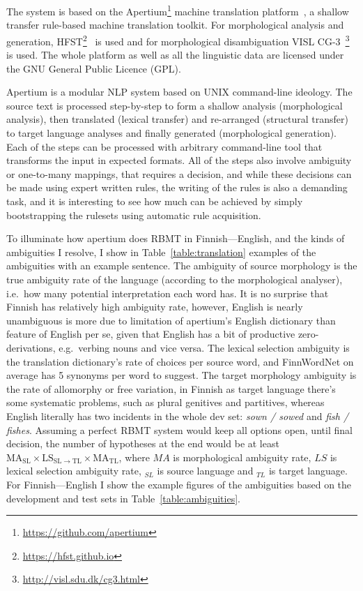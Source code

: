 \documentclass[11pt,a4paper]{article}
\begin{document}
The system is based on the Apertium\footnote{\url{https://github.com/apertium}}
machine translation platform~\cite{forcada2011apertium}, a shallow transfer
rule-based machine translation toolkit. For morphological analysis and
generation, HFST\footnote{\url{https://hfst.github.io}}~\cite{linden2011hfst} is
used and for morphological disambiguation VISL
CG-3~\footnote{\url{http://visl.sdu.dk/cg3.html}} is used.  The whole platform
as well as all the linguistic data are licensed under the GNU General Public
Licence (GPL).

Apertium is a modular NLP system based on UNIX command-line ideology. The source
text is processed step-by-step to form a shallow analysis (morphological
analysis), then translated (lexical transfer) and re-arranged (structural
transfer) to target language analyses and finally generated (morphological
generation). Each of the steps can be processed with arbitrary command-line tool
that transforms the input in expected formats. All of the steps also involve
ambiguity or one-to-many mappings, that requires a decision, and while these
decisions can be made using expert written rules, the writing of the rules is
also a demanding task, and it is interesting to see how much can be achieved by
simply bootstrapping the rulesets using automatic rule acquisition.

To illuminate how apertium does RBMT in Finnish---English, and the kinds of
ambiguities I resolve, I show in Table~\ref{table:translation} examples of the
ambiguities with an example sentence. The ambiguity of source morphology is the
true ambiguity rate of the language (according to the morphological analyser),
i.e.\ how many potential interpretation each word has. It is no surprise that
Finnish has relatively high ambiguity rate, however, English is nearly
unambiguous is more due to limitation of apertium's English dictionary than
feature of English per se, given that English has a bit of productive
zero-derivations, e.g.\ verbing nouns and vice versa. The lexical selection
ambiguity is the translation dictionary's rate of choices per source word, and
FinnWordNet on average has 5 synonyms per word to suggest. The target morphology
ambiguity is the rate of allomorphy or free variation, in Finnish as target
language there's some systematic problems, such as plural genitives and
partitives, whereas English literally has two incidents in the whole dev set:
\textit{sown / sowed} and \textit{fish / fishes}.  Assuming a perfect RBMT
system would keep all options open, until final decision, the number of
hypotheses at the end would be at least
$\mathrm{MA_{SL}}\times\mathrm{LS_{SL\rightarrow TL}}\times\mathrm{MA_{TL}}$,
where $MA$ is morphological ambiguity rate, $LS$ is lexical selection ambiguity
rate, $_{SL}$ is source language and $_{TL}$ is target language. For
Finnish---English I show the example figures of the ambiguities based on the
development and test sets in Table~\ref{table:ambiguities}.
\end{document}
